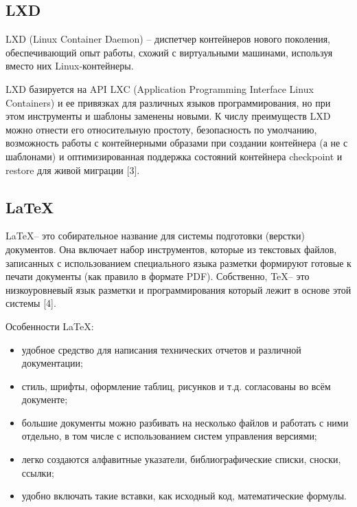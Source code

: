 \vspace{\baselineskip}

\subsection{LXD} 
LXD (Linux Container Daemon) -- диспетчер контейнеров нового поколения, обеспечивающий опыт работы, схожий с виртуальными машинами, используя вместо них Linux-контейнеры.\par
LXD базируется на API LXC (Application Programming Interface Linux Containers) и ее привязках для различных языков программирования, но при этом инструменты и шаблоны заменены новыми. К числу преимуществ LXD можно отнести его относительную простоту, безопасность по умолчанию, возможность работы с контейнерными образами при создании контейнера (а не с шаблонами) и оптимизированная поддержка состояний контейнера checkpoint и restore для живой миграции [3].\par

\vspace{\baselineskip}

\subsection{LaTeX}
\LaTeX -- это собирательное название для системы подготовки (верстки) документов. Она включает набор инструментов, которые из текстовых файлов, записанных с использованием специального языка разметки формируют готовые к печати документы (как правило в формате PDF). Собственно, \TeX -- это низкоуровневый язык разметки и программирования который лежит в основе этой системы [4].\par
Особенности \LaTeX:
\begin{itemize}
    \item удобное средство для написания технических отчетов и различной документации;
    \item стиль, шрифты, оформление таблиц, рисунков и т.д. согласованы во всём документе;
    \item большие документы можно разбивать на несколько файлов и работать с ними отдельно, в том числе с использованием систем управления версиями;
    \item легко создаются алфавитные указатели, библиографические списки, сноски, ссылки;
    \item удобно включать такие вставки, как исходный код, математические формулы.
    \end{itemize}
\vspace{\baselineskip}

